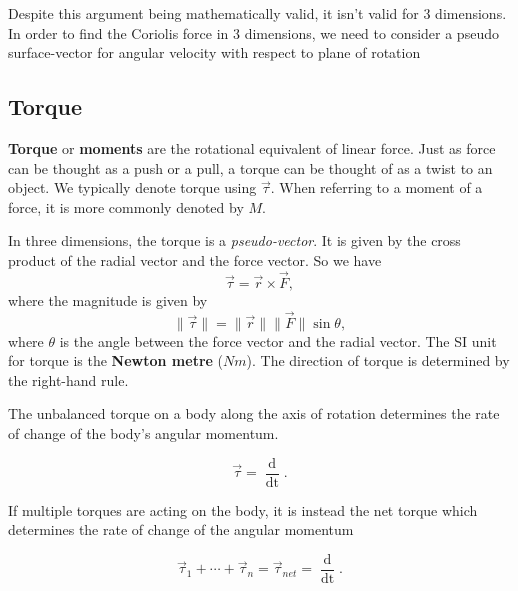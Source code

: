 Despite this argument being mathematically valid, it isn't valid for 3 dimensions. In order to find the Coriolis force in 3 dimensions, we need to consider a pseudo surface-vector for angular velocity with respect to plane of rotation

\subsection{Torque}

\textbf{Torque} or \textbf{moments} are the rotational equivalent of linear force. Just as force can be thought as a push or a pull, a torque can be thought of as a twist to an object. We typically denote torque using $\vec{\tau}$. When referring to a moment of a force, it is more commonly denoted by $M$.

In three dimensions, the torque is a \textit{pseudo-vector}. It is given by the cross product of the radial vector and the force vector. So we have
\begin{equation}
    \vec{\tau} = \vec{r} \times \vec{F},
\end{equation}
where the magnitude is given by
\begin{equation}
    \| \vec{\tau}\| = \|\vec{r}\|\| \vec{F}\|\sin \theta,
\end{equation}
where $\theta$ is the angle between the force vector and the radial vector. The SI unit for torque is the \textbf{Newton metre} ($Nm$). The direction of torque is determined by the right-hand rule.

The unbalanced torque on a body along the axis of rotation determines the rate of change of the body's angular momentum. 

\begin{equation}
     \vec{\tau}  = \frac{\mathop{\mathrm{d} \vec{L} }}{\mathop{\mathrm{d}t}}.
\end{equation}

If multiple torques are acting on the body, it is instead the net torque which determines the rate of change of the angular momentum

\begin{equation}
    \vec{\tau}_1 + \cdots + \vec{\tau}_n = \vec{\tau}_{net}  = \frac{\mathop{\mathrm{d} \vec{L}}}{\mathop{\mathrm{d}t}}.
\end{equation}

